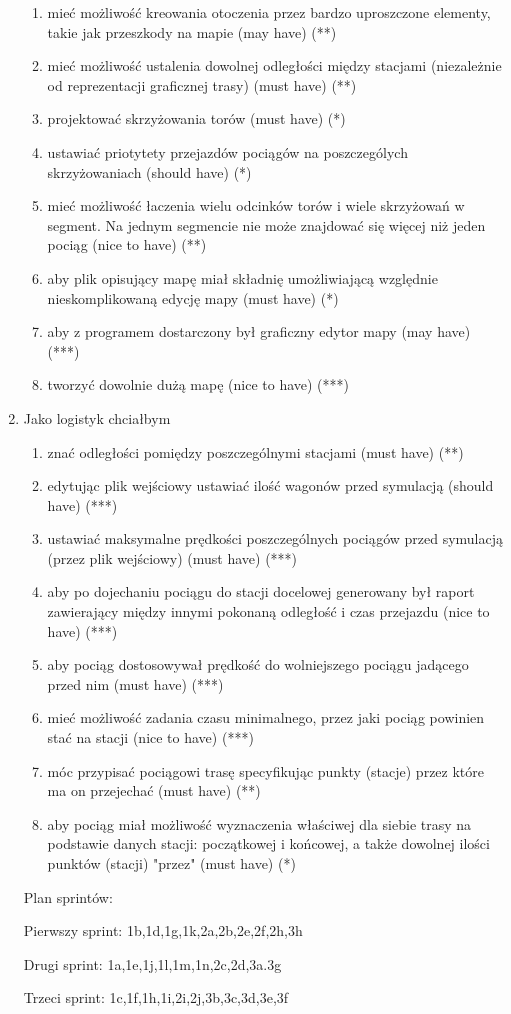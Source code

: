 \documentclass{article}
\begin{document}
\begin{enumerate}
\begin{enumerate}
\item mieć możliwość kreowania otoczenia przez bardzo uproszczone elementy, takie jak przeszkody na mapie (may have) (**)
\item mieć możliwość ustalenia dowolnej odległości między stacjami (niezależnie od reprezentacji graficznej trasy) (must have) (**)
\item projektować skrzyżowania torów (must have) (*)
\item ustawiać priotytety przejazdów pociągów na poszczególych skrzyżowaniach (should have) (*)
\item mieć możliwość łaczenia wielu odcinków torów i wiele skrzyżowań w segment. Na jednym segmencie nie może znajdować się więcej niż jeden pociąg (nice to have) (**)
\item aby plik opisujący mapę miał składnię umożliwiającą względnie nieskomplikowaną edycję mapy (must have) (*)
\item aby z programem dostarczony był graficzny edytor mapy (may have) (***)
\item tworzyć dowolnie dużą mapę (nice to have) (***)
\end {enumerate}
\item Jako logistyk chciałbym
\begin{enumerate}
\item znać odległości pomiędzy poszczególnymi stacjami (must have) (**)
\item edytując plik wejściowy ustawiać ilość wagonów przed symulacją (should have) (***)
\item ustawiać maksymalne prędkości poszczególnych pociągów przed symulacją (przez plik wejściowy) (must have) (***)
\item aby po dojechaniu pociągu do stacji docelowej generowany był raport zawierający między innymi pokonaną odległość i czas przejazdu (nice to have) (***)
\item aby pociąg dostosowywał prędkość do wolniejszego pociągu jadącego przed nim (must have) (***)
\item mieć możliwość zadania czasu minimalnego, przez jaki pociąg powinien stać na stacji (nice to have) (***)
\item móc przypisać pociągowi trasę specyfikując punkty (stacje) przez które ma on przejechać (must have) (**)
\item aby pociąg miał możliwość wyznaczenia właściwej dla siebie trasy na podstawie danych stacji: początkowej i końcowej, a także dowolnej ilości punktów (stacji) "przez" (must have) (*)
\end {enumerate}
Plan sprintów:

Pierwszy sprint:
1b,1d,1g,1k,2a,2b,2e,2f,2h,3h

Drugi sprint:
1a,1e,1j,1l,1m,1n,2c,2d,3a.3g

Trzeci sprint:
1c,1f,1h,1i,2i,2j,3b,3c,3d,3e,3f
\end{enumerate}
\end{document}
